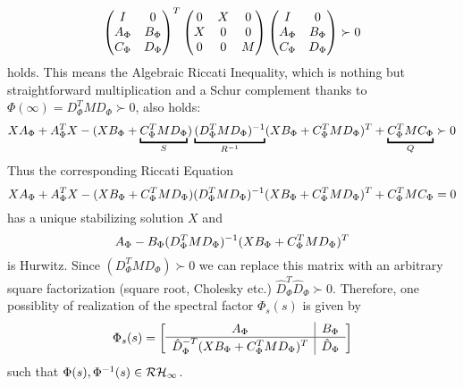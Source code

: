 \begin{equation}
\begin{pmatrix}I &0\\A_{\Phi} &B_{\Phi}\\C_{\Phi}&D_{\Phi}\end{pmatrix}^T
\begin{pmatrix}0 &X &0\\X &0 &0\\0 &0 &M\end{pmatrix}
\begin{pmatrix}I &0\\A_{\Phi} &B_{\Phi}\\C_{\Phi}&D_{\Phi}\end{pmatrix} \succ 0
\label{eq:specfactLMI}
\end{equation}
holds. This means the Algebraic Riccati Inequality, which is nothing but straightforward multiplication and a Schur complement
thanks to $\Phi(\infty)=D^T_\Phi M D_\Phi\succ 0$, also holds:
\begin{equation}
XA_{\Phi} + A^T_{\Phi}X - (XB_{\Phi}+\underbracket{C_{\Phi}^TMD_\Phi}_S)\underbracket{\inv{(D^T_{\Phi}MD_{\Phi})}}_{\inv{R}}
(XB_{\Phi}+C_{\Phi}^TMD_\Phi)^T+\underbracket{C^T_{\Phi}MC_{\Phi}}_Q \succ 0
\label{eq:specfactARI}
\end{equation}
Thus the corresponding Riccati Equation 
\begin{equation}
XA_{\Phi} + A^T_{\Phi}X - (XB_{\Phi}+C_{\Phi}^TMD_\Phi)(D^T_{\Phi}MD_{\Phi})^{-1}
(XB_{\Phi}+C_{\Phi}^TMD_\Phi)^T+C^T_{\Phi}MC_{\Phi} = 0
\label{eq:specfactARE}
\end{equation}
has a unique stabilizing solution $X$ and 
\[
A_\Phi - B_\Phi(D^T_{\Phi}MD_{\Phi})^{-1}(XB_{\Phi}+C_{\Phi}^TMD_\Phi)^T
\]
is Hurwitz. Since $(D^T_{\Phi}MD_{\Phi})\succ 0$ we can replace this matrix with an arbitrary square factorization (square root,
Cholesky etc.) $\hat{D}_\Phi^T\hat{D}_\Phi\succ 0$. Therefore, one possiblity of realization of the spectral factor $\Phi_s(s)$ is given by
\[
\Phi_s(s) = \left[
\begin{array}{c|c}
	A_\Phi &B_\Phi\\\hline
	\hat{D}_\Phi^{\mathstrut -T}(XB_{\Phi}+C_{\Phi}^TMD_\Phi)^T&\hat{D}_\Phi
\end{array}
\right]
\]
such that $\Phi(s),\Phi^{-1}(s)\in\mathcal{RH}_\infty$. 


